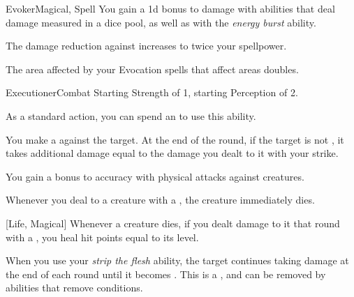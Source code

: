 \begin{feat}{Evoker}{Magical, Spell}
         You gain a \plus1d bonus to damage with  abilities that deal damage measured in a dice pool, as well as with the \textit{energy burst} ability.

         The damage reduction against  increases to twice your spellpower.

         The area affected by your Evocation spells that affect areas doubles.
    \end{feat}

    \begin{feat}{Executioner}{Combat}
        \featpres Starting Strength of 1, starting Perception of 2.
        \featben

         As a standard action, you can spend an  to use this ability.
        \begin{ability}
            \begin{spelltargetinginfo}
            \end{spelltargetinginfo}
            \begin{spelleffects}
                \spelleffect You make a  against the target.
                At the end of the round, if the target is not , it takes additional damage equal to the damage you dealt to it with your strike.
            \end{spelleffects}
        \end{ability}

         You gain a  bonus to accuracy with physical attacks against  creatures.

         Whenever you deal  to a creature with a , the creature immediately dies.

        [Life, Magical] Whenever a creature dies, if you dealt damage to it that round with a , you heal hit points equal to its level.

         When you use your \textit{strip the flesh} ability, the target continues taking damage at the end of each round until it becomes .
        This is a , and can be removed by abilities that remove conditions.


\end{feat}
